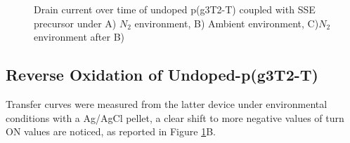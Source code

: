 \begin{figure}[!htb]
    \centering
    \qquad
    \caption[Drain current over time of undoped p(g3T2-T) coupled with SSE precursor]{Drain current over time of undoped p(g3T2-T) coupled with SSE precursor under A) $N_{2}$ environment, B) Ambient environment, C)$N_{2}$ environment after B)}
    \label{fig:revox1}
\end{figure}


\subsection{Reverse Oxidation of Undoped-p(g3T2-T)}
Transfer curves were measured from the latter device under environmental conditions with a Ag/AgCl pellet, a clear shift to more negative values of turn ON values are noticed, as reported in Figure \ref{fig:revox1}B.


